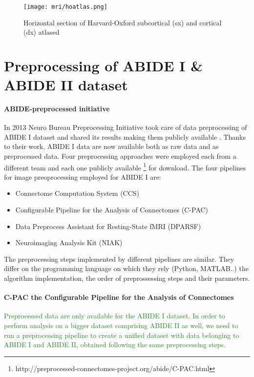 \documentclass[11pt]{report}
\begin{document}
\begin{figure}[h]
\centering
\texttt{[image: mri/hoatlas.png]}
\caption{Horizontal section of Harvard-Oxford subcortical (sx) and cortical (dx) atlased}
\label{fig:hoatlas}
\end{figure}




\section{Preprocessing of ABIDE I \& ABIDE II dataset}\label{sec:cpac}

\paragraph{ABIDE-preprocessed initiative}\hfill

In 2013 Neuro Bureau Preprocessing Initiative took care of data preprocessing of ABIDE I dataset and shared its results making them publicly available \cite{cameron2013}.
Thanks to their work, ABIDE I data are now available both as raw data and as preprocessed data.
Four preprocessing approaches were employed each from a different team and each one publicly available \footnote{http://preprocessed-connectomes-project.org/abide/C-PAC.html} for download.
The four pipelines for image preoprocessing employed for ABIDE I are:
\begin{itemize}
\item Connectome Computation System (CCS)
\item Configurable Pipeline for the Analysis of Connectomes (C-PAC)
\item Data Preprocess Assistant for Resting-State fMRI (DPARSF)
\item Neuroimaging Analysis Kit (NIAK)
\end{itemize}
The preprocessing steps implemented by different pipelines are similar. They differ on the programming language on which they rely (Python, MATLAB..) the algorithm implementation, the order of preprossessing steps and their parameters.


\paragraph{C-PAC the Configurable Pipeline for the Analysis of Connectomes}\hfill

\textcolor{ForestGreen}{Preprocessed data are only available for the ABIDE I dataset.
In order to perform analysis on a bigger dataset comprising ABIDE II as well, we need to run a preprocessing pipeline to create a unified dataset with data belonging to ABIDE I and ABIDE II, obtained following the same preprocessing steps.}
\end{document}
